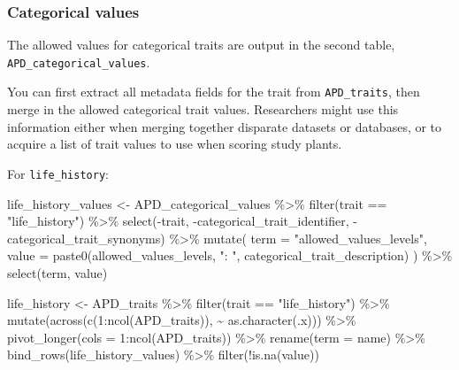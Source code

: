 \documentclass[
  letterpaper,
  DIV=11,
  numbers=noendperiod]{scrartcl}
\newenvironment{Shaded}{\begin{snugshade}}{\end{snugshade}}
\newcommand{\AttributeTok}[1]{\textcolor[rgb]{0.40,0.45,0.13}{#1}}
\newcommand{\DecValTok}[1]{\textcolor[rgb]{0.68,0.00,0.00}{#1}}
\newcommand{\FunctionTok}[1]{\textcolor[rgb]{0.28,0.35,0.67}{#1}}
\newcommand{\NormalTok}[1]{\textcolor[rgb]{0.00,0.23,0.31}{#1}}
\newcommand{\OtherTok}[1]{\textcolor[rgb]{0.00,0.23,0.31}{#1}}
\newcommand{\SpecialCharTok}[1]{\textcolor[rgb]{0.37,0.37,0.37}{#1}}
\newcommand{\StringTok}[1]{\textcolor[rgb]{0.13,0.47,0.30}{#1}}
\begin{document}
\pagebreak

\hypertarget{categorical-values}{%
\subsubsection{Categorical values}\label{categorical-values}}

The allowed values for categorical traits are output in the second
table, \texttt{APD\_categorical\_values}.

You can first extract all metadata fields for the trait from
\texttt{APD\_traits}, then merge in the allowed categorical trait
values. Researchers might use this information either when merging
together disparate datasets or databases, or to acquire a list of trait
values to use when scoring study plants.

For \texttt{life\_history}:

\begin{Shaded}
\begin{Highlighting}[]
\NormalTok{life\_history\_values }\OtherTok{\textless{}{-}}
\NormalTok{  APD\_categorical\_values }\SpecialCharTok{\%\textgreater{}\%}
    \FunctionTok{filter}\NormalTok{(trait }\SpecialCharTok{==} \StringTok{"life\_history"}\NormalTok{) }\SpecialCharTok{\%\textgreater{}\%}
    \FunctionTok{select}\NormalTok{(}\SpecialCharTok{{-}}\NormalTok{trait, }\SpecialCharTok{{-}}\NormalTok{categorical\_trait\_identifier, }\SpecialCharTok{{-}}\NormalTok{categorical\_trait\_synonyms) }\SpecialCharTok{\%\textgreater{}\%}
    \FunctionTok{mutate}\NormalTok{(}
      \AttributeTok{term =} \StringTok{"allowed\_values\_levels"}\NormalTok{,}
      \AttributeTok{value =} \FunctionTok{paste0}\NormalTok{(allowed\_values\_levels, }\StringTok{": "}\NormalTok{, categorical\_trait\_description)}
\NormalTok{      ) }\SpecialCharTok{\%\textgreater{}\%}
    \FunctionTok{select}\NormalTok{(term, value)}

\NormalTok{life\_history }\OtherTok{\textless{}{-}} 
\NormalTok{  APD\_traits }\SpecialCharTok{\%\textgreater{}\%} 
    \FunctionTok{filter}\NormalTok{(trait }\SpecialCharTok{==} \StringTok{"life\_history"}\NormalTok{) }\SpecialCharTok{\%\textgreater{}\%}
    \FunctionTok{mutate}\NormalTok{(}\FunctionTok{across}\NormalTok{(}\FunctionTok{c}\NormalTok{(}\DecValTok{1}\SpecialCharTok{:}\FunctionTok{ncol}\NormalTok{(APD\_traits)), }\SpecialCharTok{\textasciitilde{}} \FunctionTok{as.character}\NormalTok{(.x))) }\SpecialCharTok{\%\textgreater{}\%}
    \FunctionTok{pivot\_longer}\NormalTok{(}\AttributeTok{cols =} \DecValTok{1}\SpecialCharTok{:}\FunctionTok{ncol}\NormalTok{(APD\_traits)) }\SpecialCharTok{\%\textgreater{}\%}
    \FunctionTok{rename}\NormalTok{(}\AttributeTok{term =}\NormalTok{ name) }\SpecialCharTok{\%\textgreater{}\%}
    \FunctionTok{bind\_rows}\NormalTok{(life\_history\_values) }\SpecialCharTok{\%\textgreater{}\%}
    \FunctionTok{filter}\NormalTok{(}\SpecialCharTok{!}\FunctionTok{is.na}\NormalTok{(value))}
\end{Highlighting}
\end{Shaded}
\end{document}
